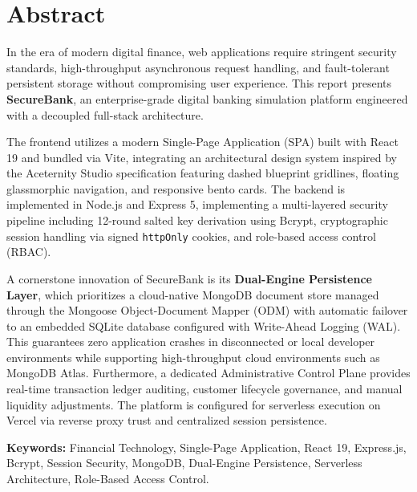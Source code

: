 \chapter*{Abstract}

In the era of modern digital finance, web applications require stringent security standards, high-throughput asynchronous request handling, and fault-tolerant persistent storage without compromising user experience. This report presents \textbf{SecureBank}, an enterprise-grade digital banking simulation platform engineered with a decoupled full-stack architecture. 

The frontend utilizes a modern Single-Page Application (SPA) built with React 19 and bundled via Vite, integrating an architectural design system inspired by the Aceternity Studio specification featuring dashed blueprint gridlines, floating glassmorphic navigation, and responsive bento cards. The backend is implemented in Node.js and Express 5, implementing a multi-layered security pipeline including 12-round salted key derivation using Bcrypt, cryptographic session handling via signed \texttt{httpOnly} cookies, and role-based access control (RBAC).

A cornerstone innovation of SecureBank is its \textbf{Dual-Engine Persistence Layer}, which prioritizes a cloud-native MongoDB document store managed through the Mongoose Object-Document Mapper (ODM) with automatic failover to an embedded SQLite database configured with Write-Ahead Logging (WAL). This guarantees zero application crashes in disconnected or local developer environments while supporting high-throughput cloud environments such as MongoDB Atlas. Furthermore, a dedicated Administrative Control Plane provides real-time transaction ledger auditing, customer lifecycle governance, and manual liquidity adjustments. The platform is configured for serverless execution on Vercel via reverse proxy trust and centralized session persistence.

\vspace{0.8cm}
\noindent \textbf{Keywords:} Financial Technology, Single-Page Application, React 19, Express.js, Bcrypt, Session Security, MongoDB, Dual-Engine Persistence, Serverless Architecture, Role-Based Access Control.
